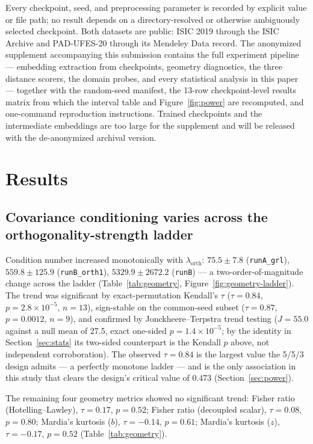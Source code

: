 Every checkpoint, seed, and preprocessing parameter is recorded by explicit value or file path; no result depends on a directory-resolved or otherwise ambiguously selected checkpoint. Both datasets are public: ISIC 2019 through the ISIC Archive and PAD-UFES-20 through its Mendeley Data record. The anonymized supplement accompanying this submission contains the full experiment pipeline --- embedding extraction from checkpoints, geometry diagnostics, the three distance scorers, the domain probes, and every statistical analysis in this paper --- together with the random-seed manifest, the 13-row checkpoint-level results matrix from which the interval table and Figure~\ref{fig:power} are recomputed, and one-command reproduction instructions. Trained checkpoints and the intermediate embeddings are too large for the supplement and will be released with the de-anonymized archival version.

\section{Results}
\label{sec:results}

\subsection{Covariance conditioning varies across the orthogonality-strength ladder}
\label{sec:geometry-changes}

Condition number increased monotonically with $\lambda_{\mathrm{orth}}$: $75.5 \pm 7.8$ (\texttt{runA\_grl}), $559.8 \pm 125.9$ (\texttt{runB\_orth1}), $5329.9 \pm 2672.2$ (\texttt{runB}) --- a two-order-of-magnitude change across the ladder (Table~\ref{tab:geometry}, Figure~\ref{fig:geometry-ladder}). The trend was significant by exact-permutation Kendall's $\tau$ ($\tau = 0.84$, $p = 2.8 \times 10^{-5}$, $n = 13$), sign-stable on the common-seed subset ($\tau = 0.87$, $p = 0.0012$, $n = 9$), and confirmed by Jonckheere--Terpstra trend testing ($J = 55.0$ against a null mean of 27.5, exact one-sided $p = 1.4 \times 10^{-5}$; by the identity in Section~\ref{sec:stats} its two-sided counterpart is the Kendall $p$ above, not independent corroboration). The observed $\tau = 0.84$ is the largest value the 5/5/3 design admits --- a perfectly monotone ladder --- and is the only association in this study that clears the design's critical value of $0.473$ (Section~\ref{sec:power}).

The remaining four geometry metrics showed no significant trend: Fisher ratio (Hotelling--Lawley), $\tau = 0.17$, $p = 0.52$; Fisher ratio (decoupled scalar), $\tau = 0.08$, $p = 0.80$; Mardia's kurtosis ($b$), $\tau = -0.14$, $p = 0.61$; Mardia's kurtosis ($z$), $\tau = -0.17$, $p = 0.52$ (Table~\ref{tab:geometry}).

